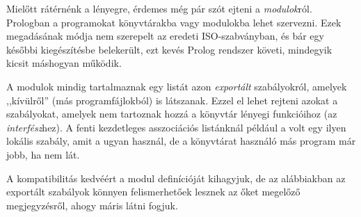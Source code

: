 
Mielőtt rátérnénk a lényegre, érdemes még pár szót
ejteni a \emph{modulok}\/ról.  Prologban a
programokat könyvtárakba vagy modulokba lehet
szervezni. Ezek megadásának módja nem szerepelt az
eredeti ISO-szabványban, és bár egy későbbi
kiegészítésbe belekerült, ezt kevés Prolog rendszer
követi, mindegyik kicsit máshogyan működik.

A modulok mindig tartalmaznak egy listát azon
\emph{exportált} szabályokról, amelyek ,,kívülről''
(más programfájlokból) is látszanak. Ezzel el lehet
rejteni azokat a szabályokat, amelyek nem tartoznak
hozzá a könyvtár lényegi funkcióihoz (az
\emph{interfész}\/hez). A fenti kezdetleges
asszociációs listánknál például a
 volt egy ilyen lokális
szabály, amit a  ugyan használ, de a
könyvtárat használó más program már jobb, ha nem
lát.  

A kompatibilitás kedvéért a modul definícióját
kihagyjuk, de az alábbiakban az exportált szabályok
könnyen felismerhetőek lesznek az őket megelőző
megjegyzésről, ahogy máris látni fogjuk.

